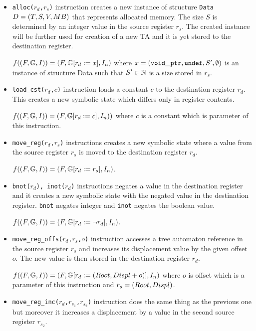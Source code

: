 \begin{itemize}

	\item {\tt alloc($r_d$,$r_s$)} instruction creates a new instance of structure {\tt Data} $D = (T,S,V,MB)$
		that represents allocated memory.
		The size $S$ is determined by an integer value in the source register $r_s$.
		The created instance will be further used for creation of a new TA
		and it is yet stored to the destination register.
		
		$f((F, \mathbb{G}, I)) = (F, 
		\mathbb{G} [
			r_{d} := x], I_n)$
		where $x=({\tt void\_ptr},{\tt undef},S',\emptyset)$ is an instance of structure Data
		such that $S' \in \mathbb{N}$ is a size stored in $r_s$. 

	\item {\tt load\_cst($r_d$,$c$)} instruction loads a constant $c$ to the destination register $r_d$.
		This creates a new symbolic state which differs only in register contents.
		
		$f((F, \mathbb{G}, I)) = (F, \mathbb{G} [r_d := c], I_n))$ where
		$c$ is a constant which is parameter of this instruction.
	
	\item {\tt move\_reg($r_d$,$r_s$)} instructions creates a new symbolic state where
		a value from the source register $r_s$ is moved to the destination register $r_d$.
		
		$f((F, \mathbb{G}, I)) = (F, \mathbb{G} [r_d := r_s], I_n)$.
	
	\item {\tt bnot($r_d$), inot($r_d$)} instructions negates a value in the destination register and
		it creates a new symbolic state with the negated value in the destination register.
		{\tt bnot} negates integer and {\tt inot} negates the boolean value.
		
		$f((F, \mathbb{G}, I)) = (F, \mathbb{G} [r_d := \neg r_d], I_n)$.
	
	\item {\tt move\_reg\_offs($r_d$,$r_s$,$o$)} instruction accesses a tree automaton
		reference in the source register $r_s$ and increases its displacement value by the given offset $o$.
		The new value is then stored in the destination register $r_d$.
		
		$f((F, \mathbb{G}, I)) = (F, \mathbb{G} [r_d := (Root,Displ+o)], I_n)$
		where $o$ is offset which is a parameter of this instruction
		and $r_s=(Root,Displ)$.
	
	\item {\tt move\_reg\_inc($r_d$,$r_{s_1}$,$r_{s_2}$)} instruction does the 
		same thing as the previous one but moreover it increases a displacement
		by a value in the second source register $r_{s_2}$.
		

\end{itemize}
